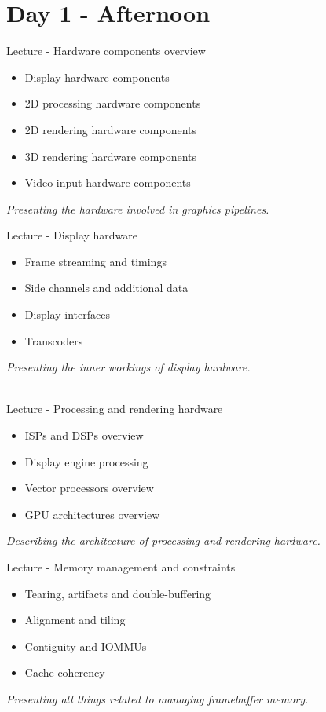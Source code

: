\documentclass[a4paper,12pt,obeyspaces,spaces,hyphens]{article}
\begin{document}
\section{Day 1 - Afternoon}

\feagendatwocolumn
{Lecture - Hardware components overview}
{
  \begin{itemize}
  \item Display hardware components
  \item 2D processing hardware components
  \item 2D rendering hardware components
  \item 3D rendering hardware components
  \item Video input hardware components
  \end{itemize}
  \vspace{0.5em}
  {\em Presenting the hardware involved in graphics pipelines.}
}
{Lecture - Display hardware}
{
  \begin{itemize}
  \item Frame streaming and timings
  \item Side channels and additional data
  \item Display interfaces
  \item Transcoders
  \end{itemize}
  \vspace{0.5em}
  {\em Presenting the inner workings of display hardware.}
}
\\

\feagendatwocolumn
{Lecture - Processing and rendering hardware}
{
  \begin{itemize}
  \item ISPs and DSPs overview
  \item Display engine processing
  \item Vector processors overview
  \item GPU architectures overview
  \end{itemize}
  \vspace{0.5em}
  {\em Describing the architecture of processing and rendering hardware.}
}
{Lecture - Memory management and constraints}
{
  \begin{itemize}
  \item Tearing, artifacts and double-buffering
  \item Alignment and tiling
  \item Contiguity and IOMMUs
  \item Cache coherency
  \end{itemize}
  \vspace{0.5em}
  {\em Presenting all things related to managing framebuffer memory.}
}
\\
\end{document}
